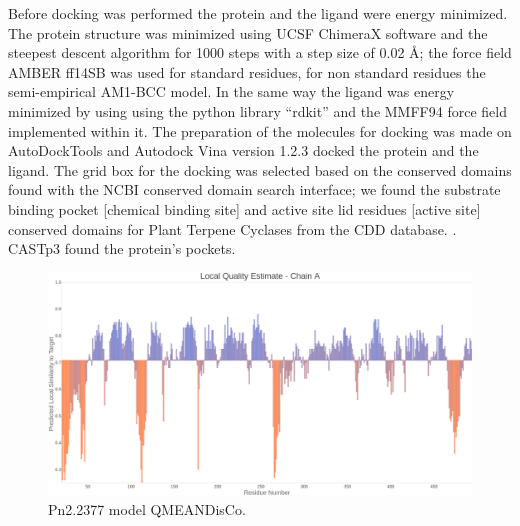 \documentclass[12pt]{article}
\begin{document}
	Before docking was performed the protein and the ligand were energy minimized. The protein structure was minimized using UCSF ChimeraX software \cite{chimera,chimera_2} and the steepest descent algorithm for 1000 steps with a step size of 0.02 \r{A}; the force field AMBER ff14SB was used for standard residues, for non standard residues the semi-empirical AM1-BCC model. \cite{am1_bcc,am1_bcc_2,am1_bcc_3} In the same way the ligand was energy minimized by using using the python library ``rdkit'' and the MMFF94 force field implemented within it. \cite{rdkit,rdkit_mmff}	The preparation of the molecules for docking was made on AutoDockTools and Autodock Vina version 1.2.3 docked the protein and the ligand. \cite{adt,vina,vina_2} The grid box for the docking was selected based on the conserved domains found with the NCBI conserved domain search interface; we found the substrate binding pocket [chemical binding site] and active site lid residues [active site] conserved domains for Plant Terpene Cyclases from the CDD database. \cite{cdd,cdd_2}. CASTp3 found the protein's pockets. \cite{castp}
	
	\FloatBarrier
	\begin{figure}[h!]
		\centering
		\includegraphics[width=\textwidth-50pt]{../9/Swiss/Local_quality_estimate.png}
		\caption{\centering Pn2.2377 model QMEANDisCo.}
		\label{fig9_2}
	\end{figure}
	\FloatBarrier
	
\end{document}
